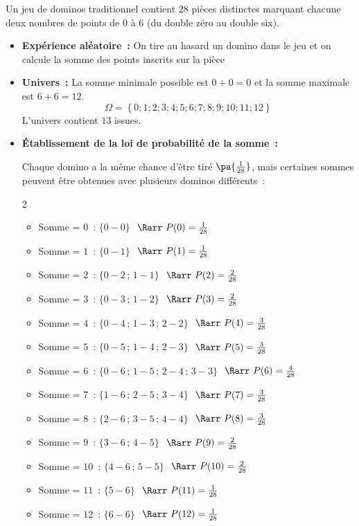 \begin{ex}
	Un jeu de dominos traditionnel contient $28$ pièces distinctes marquant chacune deux nombres de points de $0$ à $6$ (du double zéro au double six).

	\begin{itemize}
		\item \textbf{Expérience aléatoire~:} \og On tire au hasard un domino dans le jeu et on calcule la somme des points inscrits sur la pièce \fg{}

		\item \textbf{Univers~:} La somme minimale possible est $0+0=0$ et la somme maximale est $6+6=12$.
		      \[ \Omega = \left\{ 0 ; 1 ; 2 ; 3 ; 4 ; 5 ; 6 ; 7 ; 8 ; 9 ; 10 ; 11 ; 12 \right\} \]
		      L'univers contient $13$ issues.

		\item \textbf{Établissement de la loi de probabilité de la somme~:}

		      Chaque domino a la même chance d'être tiré $\pa{\frac{1}{28}}$, mais certaines sommes peuvent être obtenues avec plusieurs dominos différents~:

		      \small

		      \begin{multicols}{2}
			      \begin{itemize}[itemsep=1mm]
				      \item Somme = $0$~: $\{0-0\}$  $\ \Rarr\  P(0) = \frac{1}{28}$
				      \item Somme = $1$~: $\{0-1\}$  $\ \Rarr\  P(1) = \frac{1}{28}$
				      \item Somme = $2$~: $\{0-2\,;\,1-1\}$  $\ \Rarr\  P(2) = \frac{2}{28}$
				      \item Somme = $3$~: $\{0-3\,;\,1-2\}$  $\ \Rarr\  P(3) = \frac{2}{28}$
				      \item Somme = $4$~: $\{0-4\,;\,1-3\,;\,2-2\}$  $\ \Rarr\  P(4) = \frac{3}{28}$
				      \item Somme = $5$~: $\{0-5\,;\,1-4\,;\,2-3\}$  $\ \Rarr\  P(5) = \frac{3}{28}$
				      \item Somme = $6$~: $\{0-6\,;\,1-5\,;\,2-4\,;\,3-3\}$  $\ \Rarr\  P(6) = \frac{4}{28}$
				      \item Somme = $7$~: $\{1-6\,;\,2-5\,;\,3-4\}$  $\ \Rarr\  P(7) = \frac{3}{28}$
				      \item Somme = $8$~: $\{2-6\,;\,3-5\,;\,4-4\}$  $\ \Rarr\  P(8) = \frac{3}{28}$
				      \item Somme = $9$~: $\{3-6\,;\,4-5\}$  $\ \Rarr\  P(9) = \frac{2}{28}$
				      \item Somme = $10$~: $\{4-6\,;\,5-5\}$  $\ \Rarr\  P(10) = \frac{2}{28}$
				      \item Somme = $11$~: $\{5-6\}$  $\ \Rarr\  P(11) = \frac{1}{28}$
				      \item Somme = $12$~: $\{6-6\}$  $\ \Rarr\  P(12) = \frac{1}{28}$
			      \end{itemize}
		      \end{multicols}
		      \normalsize


\end{itemize}
\end{ex}
